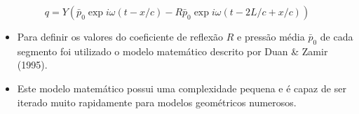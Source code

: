 \documentclass[10pt]{beamer}
\theoremstyle{remark}
\theoremstyle{definition}
\begin{document}
\begin{frame}[allowframebreaks]
		\begin{equation}
		q = Y(\bar{p}_0 \exp{i\omega(t - x/c)} -  R  \bar{p}_0 \exp{i\omega(t - 2L/c + x/c)})
		\label{04_1}
		\end{equation}
		
		\framebreak
		
		\begin{itemize}
			\item Para definir os valores do coeficiente de reflexão $R$ e pressão média $\bar{p}_0$ de cada segmento foi utilizado o modelo matemático descrito por Duan \& Zamir (1995).
			\item Este modelo matemático possui uma complexidade pequena e é capaz de ser iterado muito rapidamente para modelos geométricos numerosos.
		\end{itemize}
		
	\end{frame}
	
\end{document}
